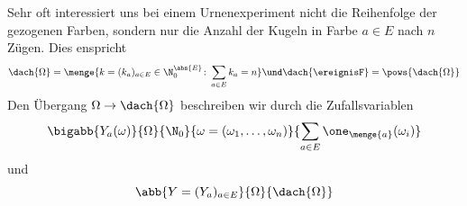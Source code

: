 Sehr oft interessiert uns bei einem Urnenexperiment nicht die Reihenfolge der gezogenen Farben, sondern nur die Anzahl der Kugeln in Farbe $a \in E$ nach $n$ Zügen. Dies enspricht
\begin{equation*}
	 \dach{\Omega} 
	 = \menge{k = (k_a)_{a \in E} \in \N_{0}^{\abs{E}} \colon \sum_{a \in E} k_a = n}
	 \und \dach{\ereignisF} = \pows{\dach{\Omega}}
\end{equation*}
Den Übergang $\Omega \to \dach{\Omega}$ beschreiben wir durch die Zufallsvariablen
\begin{equation*}
	\bigabb{Y_a(\omega)}{\Omega}{\N_{0}}%
    {\omega = (\omega_1,\dots, \omega_n)}%
    {\sum_{a \in E} \one_{\menge{a}}(\omega_i)}
\end{equation*}
und
\begin{equation*}
	\abb{Y = (Y_a)_{a \in E}}{\Omega}{\dach{\Omega}}
\end{equation*}